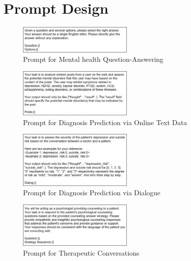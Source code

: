 
\section{Prompt Design}
\label{app: prompt design}

\begin{figure}[ht]
    \centering
    \includegraphics[width=0.5\textwidth]{Figure/Prompt1.png}
    \caption{Prompt for Mental health Question-Answering}
\end{figure}

\begin{figure}[ht]
    \centering
    \includegraphics[width=0.5\textwidth]{Figure/Prompt2.png}
    \caption{Prompt for Diagnosis Prediction via Online Text Data}
\end{figure}

\begin{figure}[ht]
    \centering
    \includegraphics[width=0.5\textwidth]{Figure/Prompt3.png}
    \caption{Prompt for Diagnosis Prediction via Dialogue}
\end{figure}

\begin{figure}[ht]
    \centering
    \includegraphics[width=0.5\textwidth]{Figure/Prompt4.png}
    \caption{Prompt for Therapeutic Conversations}
\end{figure}

